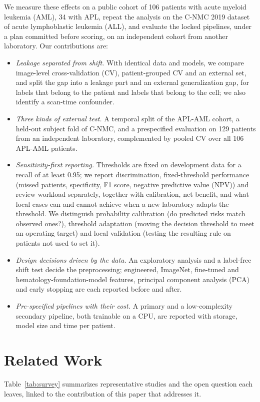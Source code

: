 \documentclass[journal]{IEEEtran}
\newcommand{\Ccontrib}[1]{\textsf{C#1}}
\begin{document}
We measure these effects on a public cohort of 106 patients with acute myeloid leukemia (AML), 34 with APL, repeat the analysis on the C-NMC 2019 dataset of acute lymphoblastic leukemia (ALL), and evaluate the locked pipelines, under a plan committed before scoring, on an independent cohort from another laboratory. Our contributions are:
\begin{itemize}
\item[\Ccontrib{1}] \emph{Leakage separated from shift.} With identical data and models, we compare image-level cross-validation (CV), patient-grouped CV and an external set, and split the gap into a leakage part and an external generalization gap, for labels that belong to the patient and labels that belong to the cell; we also identify a scan-time confounder.
\item[\Ccontrib{2}] \emph{Three kinds of external test.} A temporal split of the APL-AML cohort, a held-out subject fold of C-NMC, and a prespecified evaluation on 129 patients from an independent laboratory, complemented by pooled CV over all 106 APL-AML patients.
\item[\Ccontrib{3}] \emph{Sensitivity-first reporting.} Thresholds are fixed on development data for a recall of at least 0.95; we report discrimination, fixed-threshold performance (missed patients, specificity, F1 score, negative predictive value (NPV)) and review workload separately, together with calibration, net benefit, and what local cases can and cannot achieve when a new laboratory adapts the threshold. We distinguish probability calibration (do predicted risks match observed ones?), threshold adaptation (moving the decision threshold to meet an operating target) and local validation (testing the resulting rule on patients not used to set it).
\item[\Ccontrib{4}] \emph{Design decisions driven by the data.} An exploratory analysis and a label-free shift test decide the preprocessing; engineered, ImageNet, fine-tuned and hematology-foundation-model features, principal component analysis (PCA) and early stopping are each reported before and after.
\item[\Ccontrib{5}] \emph{Pre-specified pipelines with their cost.} A primary and a low-complexity secondary pipeline, both trainable on a CPU, are reported with storage, model size and time per patient.
\end{itemize}

\section{Related Work}
Table~\ref{tab:survey} summarizes representative studies and the open question each leaves, linked to the contribution of this paper that addresses it.
\end{document}
